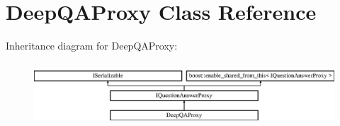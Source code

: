 \hypertarget{class_deep_q_a_proxy}{}\section{Deep\+Q\+A\+Proxy Class Reference}
\label{class_deep_q_a_proxy}
Inheritance diagram for Deep\+Q\+A\+Proxy\+:\begin{figure}[H]
\begin{center}
\leavevmode
\includegraphics[height=2.393162cm]{class_deep_q_a_proxy}
\end{center}
\end{figure}
